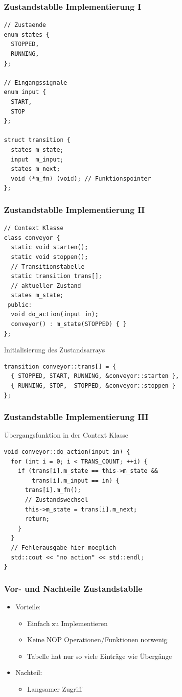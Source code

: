\documentclass{beamer}
\begin{document}
\begin{frame}[fragile]
 \frametitle{Zustandstablle Implementierung I}
 \begin{lstlisting}
// Zustaende
enum states {
  STOPPED,
  RUNNING,
};

// Eingangssignale
enum input {
  START,
  STOP
};

struct transition {
  states m_state;
  input  m_input;
  states m_next;
  void (*m_fn) (void); // Funktionspointer
};
 \end{lstlisting}
\end{frame}

\begin{frame}[fragile]
 \frametitle{Zustandstablle Implementierung II}
 \begin{lstlisting}
// Context Klasse
class conveyor {
  static void starten();
  static void stoppen();
  // Transitionstabelle
  static transition trans[];
  // aktueller Zustand
  states m_state;
 public:
  void do_action(input in);
  conveyor() : m_state(STOPPED) { }
};
 \end{lstlisting}
 Initialisierung des Zustandsarrays
 \begin{lstlisting}
transition conveyor::trans[] = {
  { STOPPED, START, RUNNING, &conveyor::starten },
  { RUNNING, STOP,  STOPPED, &conveyor::stoppen }
};
 \end{lstlisting}
\end{frame}

\begin{frame}[fragile]
 \frametitle{Zustandstablle Implementierung III}
 \"Ubergangsfunktion in der Context Klasse
 \begin{lstlisting}
void conveyor::do_action(input in) {
  for (int i = 0; i < TRANS_COUNT; ++i) {
    if (trans[i].m_state == this->m_state &&
        trans[i].m_input == in) {
      trans[i].m_fn();
      // Zustandswechsel
      this->m_state = trans[i].m_next;
      return;
    }
  }
  // Fehlerausgabe hier moeglich
  std::cout << "no action" << std::endl;
}
 \end{lstlisting}
\end{frame}

\begin{frame}
 \frametitle{Vor- und Nachteile Zustandstablle}
 \begin{itemize}
  \item Vorteile:
  \begin{itemize}
   \item Einfach zu Implementieren
   \item Keine NOP Operationen/Funktionen notwenig
   \item Tabelle hat nur so viele Eintr\"age wie \"Uberg\"ange
  \end{itemize}
  \item Nachteil:
  \begin{itemize}
   \item Langsamer Zugriff
  \end{itemize}
 \end{itemize}
\end{frame}
\end{document}
